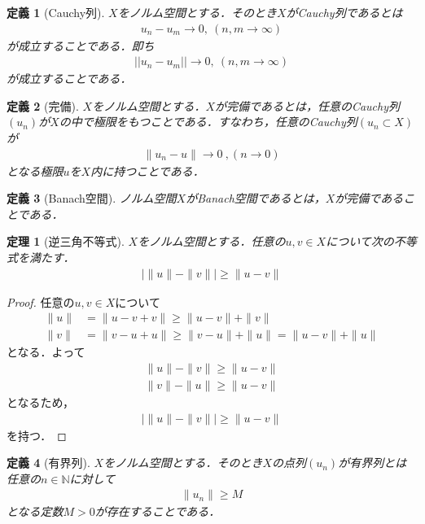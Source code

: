 \documentclass{jsarticle}
\theoremstyle{difinition}
\newtheorem{dfn}{定義}
\newtheorem{thm}{定理}
\begin{document}
\begin{dfn}[Cauchy列]
  $X$をノルム空間とする．そのとき$X$がCauchy列であるとは
  \begin{align*}
    u_n-u_m\rightarrow 0, \ \left(n,m\rightarrow\infty \right)
  \end{align*}
  が成立することである．即ち
  \begin{align*}
    ||u_n-u_m||\rightarrow 0, \ \left(n,m\rightarrow \infty\right)
  \end{align*}
  が成立することである．
\end{dfn}

\begin{dfn}[完備]
  $X$をノルム空間とする．$X$が完備であるとは，任意のCauchy列$(u_n)$が$X$の中で極限をもつことである．すなわち，任意のCauchy列$(u_n\subset X)$が
  \begin{align*}
    \|u_n-u\|\rightarrow 0\ ,\left(n\rightarrow 0\right)
  \end{align*}
  となる極限$u$を$X$内に持つことである．
\end{dfn}

\begin{dfn}[Banach空間]
  ノルム空間$X$がBanach空間であるとは，$X$が完備であることである．
\end{dfn}

\begin{thm}[逆三角不等式]
  $X$をノルム空間とする．任意の$u,v\in X$について次の不等式を満たす．
  \begin{align*}
    |\|u\|-\|v\||\geq\|u-v\|
  \end{align*}
\end{thm}

\begin{proof}
  任意の$u,v\in X$について
  \begin{align*}
    \|u\| & =\|u-v+v\|\geq\|u-v\|+\|v\|               \\
    \|v\| & =\|v-u+u\|\geq\|v-u\|+\|u\|=\|u-v\|+\|u\|
  \end{align*}
  となる．よって
  \begin{align*}
    \|u\|-\|v\|\geq\|u-v\| \\
    \|v\|-\|u\|\geq\|u-v\|
  \end{align*}
  となるため，
  \begin{align*}
    |\|u\|-\|v\||\geq\|u-v\|
  \end{align*}
  を持つ．
\end{proof}

\begin{dfn}[有界列]
  $X$をノルム空間とする．そのとき$X$の点列$(u_n)$が有界列とは任意の$n\in\mathbb{N}$に対して
  \begin{align*}
    \|u_n\|\geq M
  \end{align*}
  となる定数$M>0$が存在することである．
\end{dfn}
\end{document}
